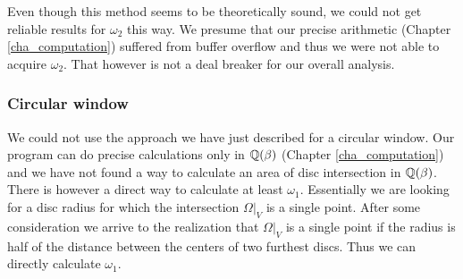 \documentclass[text.tex]{subfiles}
\begin{document}
Even though this method seems to be theoretically sound, we could not get reliable results for $\omega_2$ this way. We presume that our precise arithmetic (Chapter \ref{cha_computation}) suffered from buffer overflow and thus we were not able to acquire $\omega_2$. That however is not a deal breaker for our overall analysis. 

\subsubsection{Circular window}
We could not use the approach we have just described for a circular window. Our program can do precise calculations only in $\mathbb{Q}(\beta)$ (Chapter \ref{cha_computation}) and we have not found a way to calculate an area of disc intersection in $\mathbb{Q}(\beta)$. There is however a direct way to calculate at least $\omega_1$. Essentially we are looking for a disc radius for which the intersection $\Omega|_V$ is a single point. After some consideration we arrive to the realization that $\Omega|_V$ is a single point if the radius is half of the distance between the centers of two furthest discs. Thus we can directly calculate $\omega_1$. 
\end{document}
